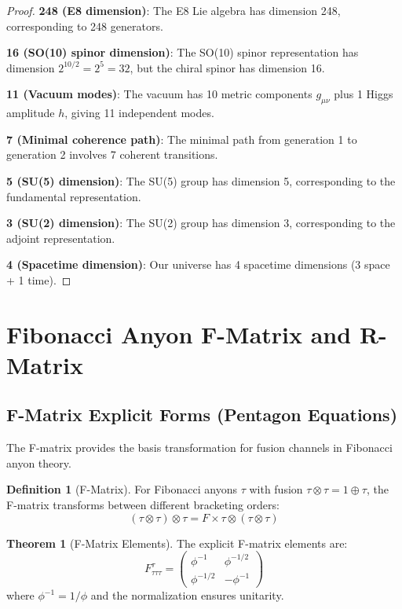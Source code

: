 \documentclass[11pt]{article}
\theoremstyle{definition}
\newtheorem{theorem}{Theorem}[section]
\newtheorem{definition}{Definition}[section]
\newcommand{\goldenratio}{\phi}
\begin{document}
\begin{proof}
\textbf{248 (E8 dimension)}:
The E8 Lie algebra has dimension 248, corresponding to 248 generators.

\textbf{16 (SO(10) spinor dimension)}:
The SO(10) spinor representation has dimension $2^{10/2} = 2^5 = 32$, but the chiral spinor has dimension 16.

\textbf{11 (Vacuum modes)}:
The vacuum has 10 metric components $g_{\mu\nu}$ plus 1 Higgs amplitude $h$, giving 11 independent modes.

\textbf{7 (Minimal coherence path)}:
The minimal path from generation 1 to generation 2 involves 7 coherent transitions.

\textbf{5 (SU(5) dimension)}:
The SU(5) group has dimension 5, corresponding to the fundamental representation.

\textbf{3 (SU(2) dimension)}:
The SU(2) group has dimension 3, corresponding to the adjoint representation.

\textbf{4 (Spacetime dimension)}:
Our universe has 4 spacetime dimensions (3 space + 1 time).
\end{proof}

\section{Fibonacci Anyon F-Matrix and R-Matrix}

\subsection{F-Matrix Explicit Forms (Pentagon Equations)}

The F-matrix provides the basis transformation for fusion channels in Fibonacci anyon theory.

\begin{definition}[F-Matrix]
For Fibonacci anyons $\tau$ with fusion $\tau \otimes \tau = 1 \oplus \tau$, the F-matrix transforms between different bracketing orders:
\begin{equation}
(\tau \otimes \tau) \otimes \tau = F \times \tau \otimes (\tau \otimes \tau)
\end{equation}
\end{definition}

\begin{theorem}[F-Matrix Elements]
The explicit F-matrix elements are:
\begin{equation}
F^{\tau}_{\tau\tau\tau} = \begin{pmatrix}
\goldenratio^{-1} & \goldenratio^{-1/2} \\
\goldenratio^{-1/2} & -\goldenratio^{-1}
\end{pmatrix}
\end{equation}
where $\goldenratio^{-1} = 1/\goldenratio$ and the normalization ensures unitarity.
\end{theorem}
\end{document}
